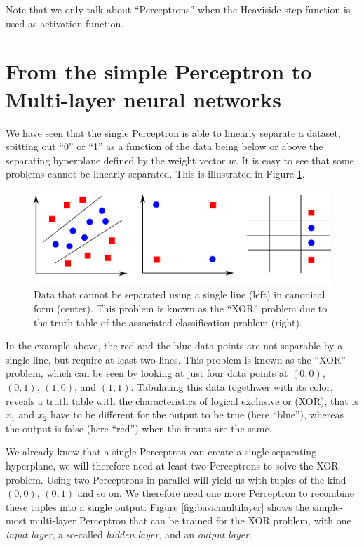 \documentclass[paper=6.14in:9.21in,pagesize=pdftex,11pt,twoside,openright]{scrbook}
\begin{document}
Note that we only talk about ``Perceptrons'' when the Heaviside step function is used as activation function. 

\section{From the simple Perceptron to Multi-layer neural networks}

We have seen that the single Perceptron is able to linearly separate a dataset, spitting out ``0'' or ``1'' as a function of the data being below or above the separating hyperplane defined by the weight vector $w$. It is easy to see that some problems cannot be linearly separated. This is illustrated in Figure \ref{fig:xorproblem}. 

\begin{figure}[!htb]
\centering
\includegraphics[width=0.9\columnwidth]{figs/xorproblem}
\caption{Data that cannot be separated using a single line (left) in canonical form (center). This problem is known as the ``XOR'' problem due to the truth table of the associated classification problem (right).\label{fig:xorproblem}} 
\end{figure}

In the example above, the red and the blue data points are not separable by a single line, but require at least two lines. This problem is known as the ``XOR'' problem, which can be seen by looking at just four data points at $(0,0)$, $(0,1)$, $(1,0)$, and $(1,1)$. Tabulating this data togethwer with its color, reveals a truth table with the characteristics of logical exclusive or (XOR), that is $x_1$ and $x_2$ have to be different for the output to be true (here ``blue''), whereas the output is false (here ``red'') when the inputs are the same.

We already know that a single Perceptron can create a single separating hyperplane, we will therefore need at least two Perceptrons to solve the XOR problem. Using two Perceptrons in parallel will yield us with tuples of the kind $(0,0)$, $(0,1)$ and so on. We therefore need one more Perceptron to recombine these tuples into a single output. Figure \ref{fig:basicmultilayer}
shows the simple-most multi-layer Perceptron that can be trained for the XOR problem, with one \emph{input layer}, a so-called \emph{hidden layer}, and an \emph{output layer}.
\end{document}

